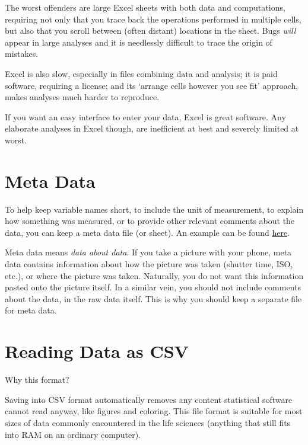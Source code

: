 \documentclass[
]{book}
\begin{document}
The worst offenders are large Excel sheets with both data and computations, requiring not only that you trace back the operations performed in multiple cells, but also that you scroll between (often distant) locations in the sheet. Bugs \emph{will} appear in large analyses and it is needlessly difficult to trace the origin of mistakes.

Excel is also slow, especially in files combining data and analysis; it is paid software, requiring a license; and its `arrange cells however you see fit' approach, makes analyses much harder to reproduce.

If you want an easy interface to enter your data, Excel is great software. Any elaborate analyses in Excel though, are inefficient at best and severely limited at worst.

\hypertarget{metadata}{%
\section{Meta Data}\label{metadata}}

To help keep variable names short, to include the unit of measurement, to explain how something was measured, or to provide other relevant comments about the data, you can keep a meta data file (or sheet). An example can be found \href{https://docs.google.com/spreadsheets/d/1dcblrkYrCO5lz7akSCkguYSWHfGxfJh2f6Pg2B8Q9ck/edit?pli=1\#gid=322816193}{here}.

Meta data means \emph{data about data}. If you take a picture with your phone, meta data contains information about how the picture was taken (shutter time, ISO, etc.), or where the picture was taken. Naturally, you do not want this information pasted onto the picture itself. In a similar vein, you should not include comments about the data, in the raw data itself. This is why you should keep a separate file for meta data.

\hypertarget{csv}{%
\section{Reading Data as CSV}\label{csv}}

Why this format?

Saving into CSV format automatically removes any content statistical software cannot read anyway, like figures and coloring. This file format is suitable for most sizes of data commonly encountered in the life sciences (anything that still fits into RAM on an ordinary computer).
\end{document}
